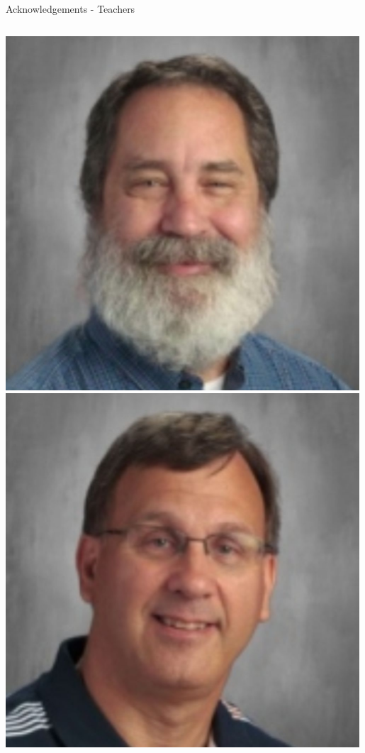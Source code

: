 \documentclass[aspectratio=169]{beamer}
\begin{document}
\begin{frame}{Acknowledgements - Teachers}
\begin{columns}
            \centering
            \includegraphics[width=0.99\textwidth]{people/teachers/mcevoy.png}
            \includegraphics[width=0.99\textwidth]{people/teachers/landry.png}


\end{columns}
\end{frame}
\end{document}
